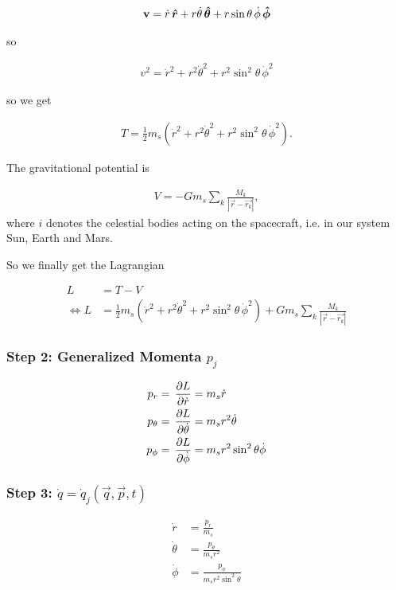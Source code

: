 \begin{align}
    \mathbf{v} = \dot{r}\operatorname{}\!\bm{\hat{r}} + r\dot{\theta}\operatorname{}\!\bm{\hat{\theta}} + r\sin{\theta}\,\dot{\phi}\operatorname{}\!\bm{\hat{\phi}}
\end{align}

so

\begin{align}
    v^2 = \dot{r}^2 + r^2\dot{\theta}^2 + r^2\sin^2{\theta}\,\dot{\phi}^2
\end{align}

so we get

\begin{align}
    T = \frac{1}{2} m_s (\dot{r}^2 + r^2\dot{\theta}^2 + r^2\sin^2{\theta}\,\dot{\phi}^2).
\end{align}

The gravitational potential is \cite{WikiGravPotential}

\begin{align}
    V = -G m_s \sum\limits_{k} \frac{M_k}{\left| \vec{r} - \vec{r_k} \right|},
\end{align}
where \(i\) denotes the celestial bodies acting on the spacecraft, i.e. in our system Sun, Earth and Mars.

So we finally get the Lagrangian

\begin{align}
    L &= T - V \\
    \Leftrightarrow L &= \frac{1}{2} m_s (\dot{r}^2 + r^2\dot{\theta}^2 + r^2\sin^2{\theta}\,\dot{\phi}^2) + G m_s \sum\limits_{k} \frac{M_k}{\left| \vec{r} - \vec{r_k} \right|}
\end{align}

\subsubsection{Step 2: Generalized Momenta \(p_j\)}
\begin{align}
    p_r &= \operatorname{}\frac{\partial L}{\partial \dot{r}} = m_s \dot{r} \label{eq:pr} \\
    p_\theta &= \operatorname{}\frac{\partial L}{\partial \dot{\theta}} = m_s r^2 \dot{\theta} \label{eq:ptheta} \\
    p_\phi &= \operatorname{}\frac{\partial L}{\partial \dot{\phi}} = m_s r^2 \sin^2{\theta} \dot{\phi} \label{eq:pphi}
\end{align}

\subsubsection{Step 3: \(\dot{q} = \dot{q}_j(\vec{q}, \vec{p}, t)\)}
\begin{align}
    \dot{r} &= \frac{p_r}{m_s} \\
    \dot{\theta} &= \frac{p_\theta}{m_s r^2} \\
    \dot{\phi} &= \frac{p_\phi}{m_s r^2 \sin^2{\theta}}
\end{align}

